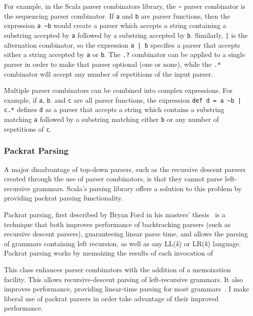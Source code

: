 For example, in the Scala parser combinators library, the \texttt{\textasciitilde} parser combinator is the sequencing parser combinator. If \texttt{a} and \texttt{b} are parser functions, then the expression \texttt{a \textasciitilde b} would create a parser which accepts a string containing a substring accepted by \texttt{a} followed by a substring accepted by \texttt{b}. Similarly,  \texttt{|} is the alternation combinator, so the expression \texttt{a | b} specifies a parser that accepts either a string accepted by \texttt{a} or \texttt{b}.  The \texttt{.?} combinator can be applied to a single parser in order to make that parser optional (one or none), while the \texttt{.*} combinator will accept any number of repetitions of the input parser. 

Multiple parser combinators can be combined into complex expressions. For example, if \texttt{a}, \texttt{b}. and \texttt{c} are all parser functions, the expression \texttt{def d = a \textasciitilde b | c.*} defines \texttt{d} as a parser that accepts a string which contains a substring matching \texttt{a} followed by a substring matching either \texttt{b} or any number of repetitions of \texttt{c}.

\subsubsection{Packrat Parsing}
A major disadvantage of top-down parsers, such as the recursive descent parsers created through the use of parser combinators, is that they cannot parse left-recursive grammars. Scala's parsing library offers a solution to this problem by providing packrat parsing functionality.

Packrat parsing, first described by Bryan Ford in his masters' thesis~\cite{ford2002packrat} is a technique that both improves performance of backtracking parsers (such as recursive descent parsers), guaranteeing linear parse time, and allows the parsing of grammars containing left recursion, as well as any LL(\textit{k}) or LR(\textit{k}) language. Packrat parsing works by memoizing the results of each invocation of 

This class enhances parser combinators with the addition of a memoization facility. This allows recursive-descent parsing of left-recursive grammars. It also improves performance, providing linear-time parsing for most grammars~\cite{jonnalagedda2009packrat,ford2002packrat,ford2002packrat2}. I make liberal use of packrat parsers in order take advantage of their improved performance.

